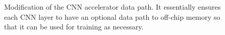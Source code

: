 \begin{figure}
        \caption{Modification of the CNN accelerator data path. It essentially
ensures each CNN layer to have an optional data path to off-chip memory so that it
can be used for training as necessary.}
        \label{fig:change_of_accelerator}
        \vspace{-1em}
\end{figure}



